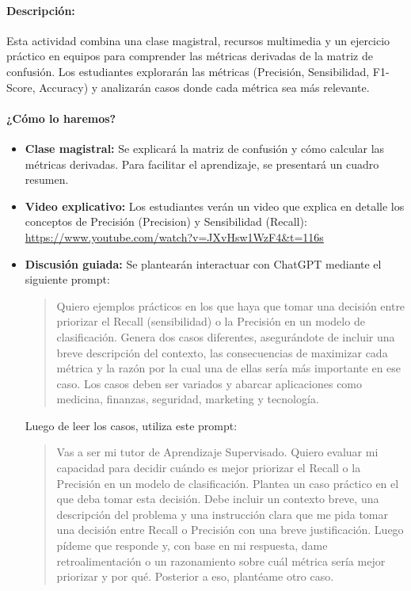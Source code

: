 \documentclass[a4,11pt]{aleph-notas}
\begin{document}
\paragraph{Descripción:}  
Esta actividad combina una clase magistral, recursos multimedia y un ejercicio práctico en equipos para comprender las métricas derivadas de la matriz de confusión. Los estudiantes explorarán las métricas (Precisión, Sensibilidad, F1-Score, Accuracy) y analizarán casos donde cada métrica sea más relevante.

\paragraph{¿Cómo lo haremos?}  
\begin{itemize}[leftmargin=*]
    \item \textbf{Clase magistral:}  
    Se explicará la matriz de confusión y cómo calcular las métricas derivadas. Para facilitar el aprendizaje, se presentará un cuadro resumen.

    \item \textbf{Video explicativo:}  
    Los estudiantes verán un video que explica en detalle los conceptos de Precisión (Precision) y Sensibilidad (Recall): \url{https://www.youtube.com/watch?v=JXvHsw1WzF4&t=116s}

    \item \textbf{Discusión guiada:}  
    Se plantearán interactuar con ChatGPT mediante el siguiente prompt:
    \begin{quote}\small
        Quiero ejemplos prácticos en los que haya que tomar una decisión entre priorizar el Recall (sensibilidad) o la Precisión en un modelo de clasificación. Genera dos casos diferentes, asegurándote de incluir una breve descripción del contexto, las consecuencias de maximizar cada métrica y la razón por la cual una de ellas sería más importante en ese caso. Los casos deben ser variados y abarcar aplicaciones como medicina, finanzas, seguridad, marketing y tecnología.
    \end{quote}
    Luego de leer los casos, utiliza este prompt:
    \begin{quote}\small
        Vas a ser mi tutor de Aprendizaje Supervisado. Quiero evaluar mi capacidad para decidir cuándo es mejor priorizar el Recall o la Precisión en un modelo de clasificación. Plantea un caso práctico en el que deba tomar esta decisión. Debe incluir un contexto breve, una descripción del problema y una instrucción clara que me pida tomar una decisión entre Recall o Precisión con una breve justificación. Luego pídeme que responde y, con base en mi respuesta, dame retroalimentación o un razonamiento sobre cuál métrica sería mejor priorizar y por qué. Posterior a eso, plantéame otro caso.
    \end{quote}


\end{itemize}
\end{document}
